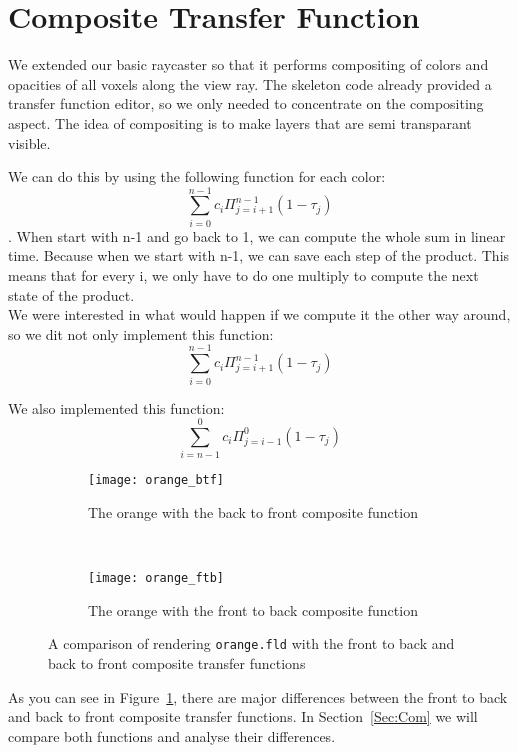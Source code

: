 \section{Composite Transfer Function}\label{Sec:Ctf}
We extended our basic raycaster so that it performs compositing of colors and opacities of all voxels along the view ray.
The skeleton code already provided a transfer function editor, so we only needed to concentrate on the compositing aspect.
The idea of compositing is to make layers that are semi transparant visible.

We can do this by using the following function for each color: 
$$\sum_{i=0}^{n-1} c_{i}\Pi_{j=i+1}^{n-1}(1-\tau_{j})  $$.
When start with n-1 and go back to 1, we can compute the whole sum in linear time. 
Because when we start with n-1, we can save each step of the product.
This means that for every i, we only have to do one multiply to compute the next state of the product.\\
We were interested in what would happen if we compute it the other way around, so we dit not only implement this function: \\

$$\sum_{i=0}^{n-1} c_{i}\Pi_{j=i+1}^{n-1}(1-\tau_{j})  $$

We also implemented this function: \\
$$\sum_{i=n-1}^{0} c_{i}\Pi_{j=i-1}^{0}(1-\tau_{j})  $$

\begin{figure}[H]
	\centering
	\begin{subfigure}[t]{0.45\textwidth}
		\texttt{[image: orange\_btf]}
		\caption{The orange with the back to front composite function}
	\end{subfigure}
	~%
	\begin{subfigure}[t]{0.45\textwidth}
		\texttt{[image: orange\_ftb]}
		\caption{The orange with the front to back composite function}
	\end{subfigure}
	
	\caption{A comparison of rendering \texttt{orange.fld} with the front to back and back to front composite transfer functions}
	\label{fig:ctf:comp}
\end{figure}

As you can see in Figure~\ref{fig:ctf:comp}, there are major differences between the front to back and back to front composite transfer functions.
In Section~\ref{Sec:Com} we will compare both functions and analyse their differences.
